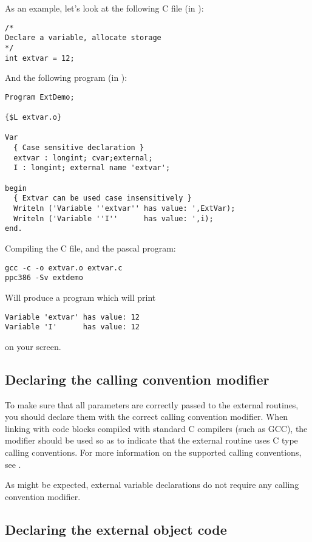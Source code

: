 As an example, let's look at the following C file (in ):
\begin{verbatim}
/*
Declare a variable, allocate storage
*/
int extvar = 12;
\end{verbatim}
And the following program (in ):
\begin{verbatim}
Program ExtDemo;

{$L extvar.o}

Var 
  { Case sensitive declaration }
  extvar : longint; cvar;external;
  I : longint; external name 'extvar';

begin
  { Extvar can be used case insensitively }
  Writeln ('Variable ''extvar'' has value: ',ExtVar);
  Writeln ('Variable ''I''      has value: ',i);
end.
\end{verbatim}
Compiling the C file, and the pascal program:
\begin{verbatim}
gcc -c -o extvar.o extvar.c
ppc386 -Sv extdemo
\end{verbatim}
Will produce a program  which will print
\begin{verbatim}
Variable 'extvar' has value: 12
Variable 'I'      has value: 12
\end{verbatim}
on your screen.

\subsection{Declaring the calling convention modifier}

To make sure that all parameters are correctly passed to the
external routines, you should declare them with the correct
calling convention modifier. When linking with code blocks
compiled with standard C compilers (such as GCC), the 
modifier should be used so as to indicate that the external
routine uses C type calling conventions. For more information
on the supported calling conventions, see .

As might be expected, external variable declarations do not require
any calling convention modifier.

\subsection{Declaring the external object code}

